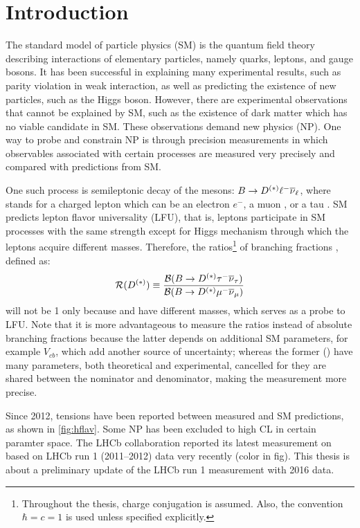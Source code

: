 \chapter{Introduction}

The standard model of particle physics (SM)
is the quantum field theory describing interactions of elementary particles,
namely quarks, leptons, and gauge bosons.
It has been successful in explaining many experimental results, such as parity
violation in weak interaction,
as well as predicting the existence of new particles, such as the Higgs boson.
However,
there are experimental observations that cannot be explained by SM,
such as the existence of dark matter
which has no viable candidate in SM.
These observations demand new physics (NP).
One way to probe and constrain NP is through precision measurements
in which observables associated with certain processes are measured very
precisely and compared with predictions from SM.

One such process is semileptonic decay of the \B mesons:
$B \rightarrow D^{(*)} {\ell^-} {{\overline{\nu}}_\ell}$,
where \ellm stands for a charged lepton which can be an electron $e^-$,
a muon \mun, or a tau \taum.
SM predicts lepton flavor universality (LFU),
that is, leptons participate in SM processes with the same strength
except for Higgs mechanism through which the leptons acquire different masses.
Therefore,
the ratios\footnote{
    Throughout the thesis, charge conjugation is assumed.
    Also, the convention $\hbar = c = 1$ is used unless specified explicitly.
} of branching fractions \RDX, defined as:
\begin{equation}
    \mathcal{R}(D^{(*)}) \equiv \frac{\mathcal{B}(B \rightarrow D^{(*)} {\tau^-} {{\overline{\nu}}_\tau})}{\mathcal{B}(B \rightarrow D^{(*)} {\mu^-} {{\overline{\nu}}_\mu})}
\end{equation}
will not be 1 only because \taum and \mun have different masses,
which serves as a probe to LFU.
Note that it is more advantageous to measure the ratios instead of absolute
branching fractions because the latter depends on additional SM parameters,
for example $V_{cb}$,
which add another source of uncertainty;
whereas the former (\RDX) have many parameters, both theoretical and
experimental, cancelled for they are shared between the nominator and
denominator, making the measurement more precise.

Since 2012, tensions have been reported between measured \RDX and SM predictions,
as shown in \cref{fig:hflav}.
Some NP has been excluded to high CL in certain paramter space.
The LHCb collaboration reported its latest measurement on \RDX based on LHCb run
1 (2011--2012) data very recently (color in fig).
This thesis is about a preliminary update of the LHCb run 1 measurement with
2016 data.

